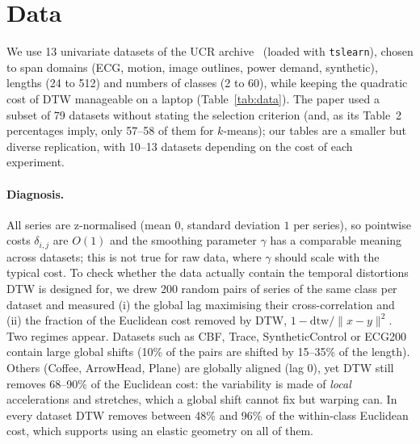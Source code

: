 \section{Data}
\label{sec:data}

We use 13 univariate datasets of the UCR archive~\cite{ucr2018} (loaded with \texttt{tslearn}), chosen to span domains (ECG, motion, image outlines, power demand, synthetic), lengths (24 to 512) and numbers of classes (2 to 60), while keeping the quadratic cost of DTW manageable on a laptop (Table~\ref{tab:data}). The paper used a subset of 79 datasets without stating the selection criterion (and, as its Table~2 percentages imply, only 57--58 of them for $k$-means); our tables are a smaller but diverse replication, with 10--13 datasets depending on the cost of each experiment.

\paragraph{Diagnosis.}
All series are z-normalised (mean $0$, standard deviation $1$ per series), so pointwise costs $\delta_{i,j}$ are $O(1)$ and the smoothing parameter $\gamma$ has a comparable meaning across datasets; this is not true for raw data, where $\gamma$ should scale with the typical cost. To check whether the data actually contain the temporal distortions DTW is designed for, we drew 200 random pairs of series of the same class per dataset and measured (i) the global lag maximising their cross-correlation and (ii) the fraction of the Euclidean cost removed by DTW, $1-\mathrm{dtw}/\|x-y\|^2$. Two regimes appear. Datasets such as CBF, Trace, SyntheticControl or ECG200 contain large global shifts (10\% of the pairs are shifted by 15--35\% of the length). Others (Coffee, ArrowHead, Plane) are globally aligned (lag $0$), yet DTW still removes 68--90\% of the Euclidean cost: the variability is made of \emph{local} accelerations and stretches, which a global shift cannot fix but warping can. In every dataset DTW removes between 48\% and 96\% of the within-class Euclidean cost, which supports using an elastic geometry on all of them.

